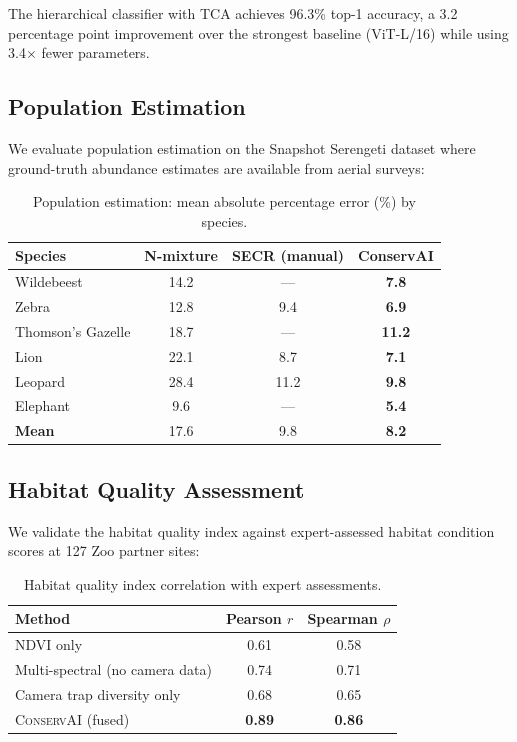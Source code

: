 \documentclass[11pt,letterpaper]{article}
\newcommand{\ConservAI}{\textsc{ConservAI}}
\begin{document}
The hierarchical classifier with TCA achieves 96.3\% top-1 accuracy, a 3.2 percentage point improvement over the strongest baseline (ViT-L/16) while using 3.4$\times$ fewer parameters.

\subsection{Population Estimation}

We evaluate population estimation on the Snapshot Serengeti dataset where ground-truth abundance estimates are available from aerial surveys:

\begin{table}[htbp]
\centering
\caption{Population estimation: mean absolute percentage error (\%) by species.}
\label{tab:population}
\begin{tabular}{lccc}
\toprule
\textbf{Species} & \textbf{N-mixture} & \textbf{SECR (manual)} & \textbf{ConservAI} \\
\midrule
Wildebeest & 14.2 & --- & \textbf{7.8} \\
Zebra & 12.8 & 9.4 & \textbf{6.9} \\
Thomson's Gazelle & 18.7 & --- & \textbf{11.2} \\
Lion & 22.1 & 8.7 & \textbf{7.1} \\
Leopard & 28.4 & 11.2 & \textbf{9.8} \\
Elephant & 9.6 & --- & \textbf{5.4} \\
\midrule
\textbf{Mean} & 17.6 & 9.8 & \textbf{8.2} \\
\bottomrule
\end{tabular}
\end{table}

\subsection{Habitat Quality Assessment}

We validate the habitat quality index against expert-assessed habitat condition scores at 127 Zoo partner sites:

\begin{table}[htbp]
\centering
\caption{Habitat quality index correlation with expert assessments.}
\label{tab:habitat}
\begin{tabular}{lcc}
\toprule
\textbf{Method} & \textbf{Pearson $r$} & \textbf{Spearman $\rho$} \\
\midrule
NDVI only & 0.61 & 0.58 \\
Multi-spectral (no camera data) & 0.74 & 0.71 \\
Camera trap diversity only & 0.68 & 0.65 \\
\ConservAI{} (fused) & \textbf{0.89} & \textbf{0.86} \\
\bottomrule
\end{tabular}
\end{table}
\end{document}
